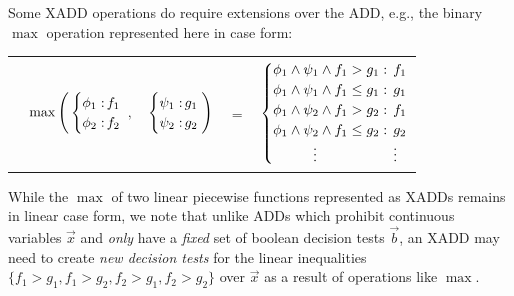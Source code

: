 Some XADD operations do require extensions over the ADD, e.g., the
binary $\max$ operation represented here in case form:

\vspace{-3mm}
{\footnotesize
\begin{center}
\begin{tabular}{r c c c l}
&
\hspace{-7mm} $\max \Bigg(
  \begin{cases}
    \phi_1: \hspace{-2mm} & \hspace{-1mm} f_1 \\ 
    \phi_2: \hspace{-2mm} & \hspace{-1mm} f_2 \\ 
  \end{cases}$
$,$
&
\hspace{-4mm}
  $\begin{cases}
    \psi_1: \hspace{-2mm} & \hspace{-1mm} g_1 \\ 
    \psi_2: \hspace{-2mm} & \hspace{-1mm} g_2 \\ 
  \end{cases} \Bigg)$
&
\hspace{-4mm} 
$ = $
&
\hspace{-4mm}
  $\begin{cases}
  \phi_1 \wedge \psi_1 \wedge f_1 > g_1    : & \hspace{-2mm} f_1 \\ 
  \phi_1 \wedge \psi_1 \wedge f_1 \leq g_1 : & \hspace{-2mm} g_1 \\ 
  \phi_1 \wedge \psi_2 \wedge f_1 > g_2    : & \hspace{-2mm}f_1 \\ 
  \phi_1 \wedge \psi_2 \wedge f_1 \leq g_2 : & \hspace{-2mm} g_2 \\ 
  \hspace{1cm}\vdots \hspace{8mm} & \hspace{-2mm} \vdots
  \end{cases}$
\end{tabular}
\end{center}
\vspace{-1mm}
} While the $\max$ of two linear piecewise functions represented as
XADDs remains in linear case form, we note that unlike ADDs which
prohibit continuous variables $\vec{x}$ and \emph{only} have a \emph{fixed} set of
boolean decision tests $\vec{b}$, an XADD may need to create
\emph{new decision tests} for the linear inequalities $\{ f_1 > g_1, f_1 >
g_2, f_2 > g_1, f_2 > g_2 \}$ over $\vec{x}$ as a result of operations
like $\max$.

